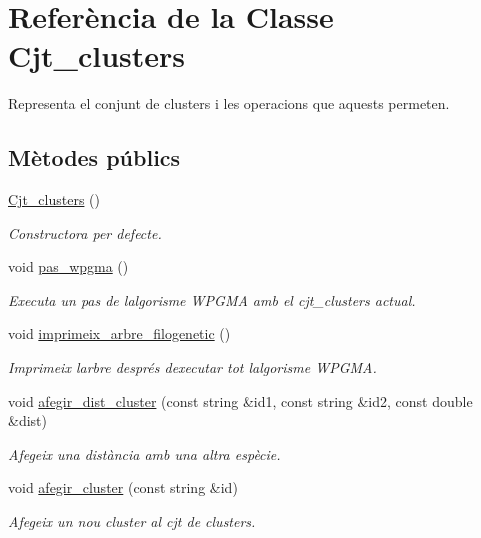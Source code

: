 \hypertarget{class_cjt__clusters}{}\section{Referència de la Classe Cjt\+\_\+clusters}
\label{class_cjt__clusters}


Representa el conjunt de clusters i les operacions que aquests permeten.  


\subsection*{Mètodes públics}
\begin{DoxyCompactItemize}
\item 
\hyperlink{class_cjt__clusters_a10dd63eab0e8ea5b1ed13e81412d47a9}{Cjt\+\_\+clusters} ()
\begin{DoxyCompactList}\small\item\em Constructora per defecte. \end{DoxyCompactList}\item 
void \hyperlink{class_cjt__clusters_a0675e6339f6a8fad8219518c377fbcf9}{pas\+\_\+wpgma} ()
\begin{DoxyCompactList}\small\item\em Executa un pas de l\textquotesingle{}algorisme W\+P\+G\+MA amb el cjt\+\_\+clusters actual. \end{DoxyCompactList}\item 
void \hyperlink{class_cjt__clusters_a952291f47c4dd2edf62b3c110bee24f2}{imprimeix\+\_\+arbre\+\_\+filogenetic} ()
\begin{DoxyCompactList}\small\item\em Imprimeix l\textquotesingle{}arbre després d\textquotesingle{}executar tot l\textquotesingle{}algorisme W\+P\+G\+MA. \end{DoxyCompactList}\item 
void \hyperlink{class_cjt__clusters_a928bbb5f0ee0756d291ad28e453892bb}{afegir\+\_\+dist\+\_\+cluster} (const string \&id1, const string \&id2, const double \&dist)
\begin{DoxyCompactList}\small\item\em Afegeix una distància amb una altra espècie. \end{DoxyCompactList}\item 
void \hyperlink{class_cjt__clusters_a2a27f4c57c217eeec5e91777dda19c9d}{afegir\+\_\+cluster} (const string \&id)
\begin{DoxyCompactList}\small\item\em Afegeix un nou cluster al cjt de clusters. \end{DoxyCompactList}\item 

\end{DoxyCompactItemize}
